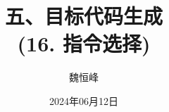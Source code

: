 \documentclass[]{beamer}
\title[目标代码生成]{五、目标代码生成 \\ (16. 指令选择)}
\author[魏恒峰]{\large 魏恒峰}
\institute{hfwei@nju.edu.cn}
\date{2024年06月12日}
\begin{document}
\maketitle





\thankyou{}

\end{document}
